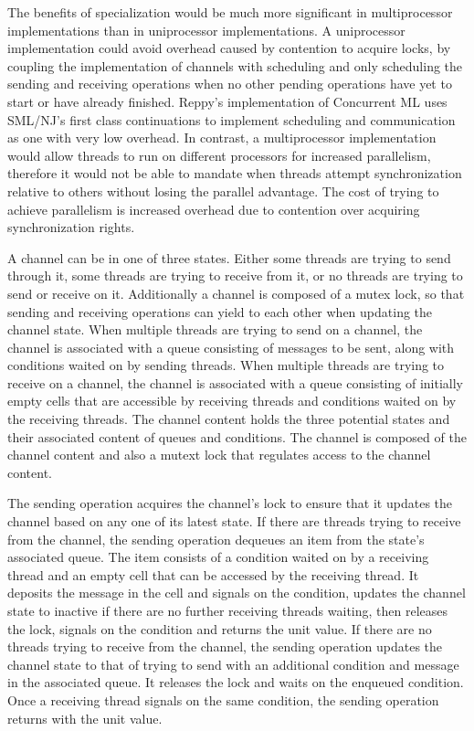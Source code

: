 \documentclass{article}
\begin{document}
The benefits of specialization would be much more significant in multiprocessor
implementations than in uniprocessor implementations. A uniprocessor
implementation could avoid overhead caused by contention to acquire locks, by coupling the
implementation of channels with scheduling and only scheduling the sending and receiving
operations when no other pending operations have yet to start or have already finished.
Reppy's implementation of
Concurrent ML uses SML/NJ's first class continuations to implement scheduling and communication
as one with very low overhead. In contrast, a multiprocessor
implementation would allow threads to run
on different processors for increased parallelism,
therefore it would not be able to mandate when
threads attempt synchronization relative to others without losing the parallel advantage.
The cost of trying to achieve parallelism
is increased overhead due to contention over acquiring
synchronization rights. 

A channel can be in one of three states.  Either some threads are trying to send through it,
some threads are trying to receive from it, or no threads are trying to send or receive on it.
Additionally a channel is composed of a mutex lock,
so that sending and receiving operations can yield
to each other when updating the channel state. When multiple threads are trying to send on a
channel, the channel is associated with a queue consisting of messages to be sent, along with
conditions waited on by sending threads. When multiple threads are trying to receive on a
channel, the channel is associated with a queue consisting of
initially empty cells that are accessible
by receiving threads and conditions waited on by
the receiving threads. The channel content holds the
three potential states and their associated content of queues and conditions.
The channel is composed of the channel content and also a mutext lock that regulates access to
the channel content.

The sending operation acquires the channel's lock to
ensure that it updates the channel based on
any one of its latest state.  If there are threads trying
to receive from the channel, the sending 
operation dequeues an item from the state's associated queue.  The item consists of a condition
waited on by a receiving thread and an empty cell that can be accessed by the receiving thread.
It deposits the message in the cell and signals on the condition, updates the channel state to
inactive if there are no further receiving threads waiting, then releases the lock, signals on
the condition and returns the unit value.  If there are no threads trying to receive from the
channel, the sending operation updates the channel state to that of trying to send with an
additional condition and message in the associated queue.  It releases the lock and waits on
the enqueued condition.  Once a receiving thread signals on the same condition, the sending 
operation returns with the unit value.
\end{document}
